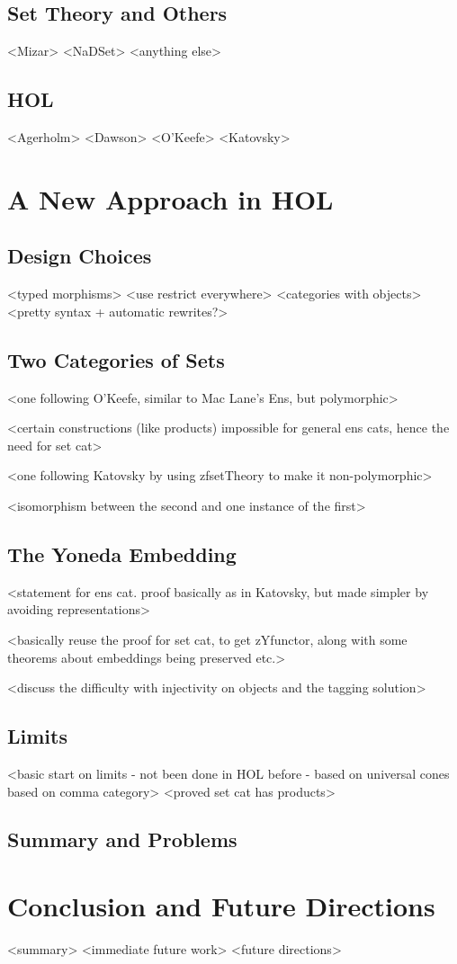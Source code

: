 \documentclass[twoside,titlepage,11pt]{article}
\begin{document}
\subsection{Set Theory and Others}%
  <Mizar>%
  <NaDSet>%
  <anything else>%
\subsection{HOL}%
  <Agerholm>%
  <Dawson>%
  <O'Keefe>%
  <Katovsky>%
\section{A New Approach in HOL}%
\subsection{Design Choices}%
<typed morphisms>
<use restrict everywhere>
<categories with objects>
<pretty syntax + automatic rewrites?>
\subsection{Two Categories of Sets}%
<one following O'Keefe, similar to Mac Lane's Ens, but polymorphic>

<certain constructions (like products) impossible for general ens cats, hence the need for set cat>

<one following Katovsky by using zfsetTheory to make it non-polymorphic>

<isomorphism between the second and one instance of the first>
\subsection{The Yoneda Embedding}%
<statement for ens cat. proof basically as in Katovsky, but made simpler by avoiding representations>

<basically reuse the proof for set cat, to get zYfunctor, along with some theorems about embeddings being preserved etc.>

<discuss the difficulty with injectivity on objects and the tagging solution>
\subsection{Limits}%
<basic start on limits - not been done in HOL before - based on universal cones based on comma category>
<proved set cat has products>
\subsection{Summary and Problems}%
\section{Conclusion and Future Directions}%
<summary>%
<immediate future work>%
<future directions>%


\end{document}
